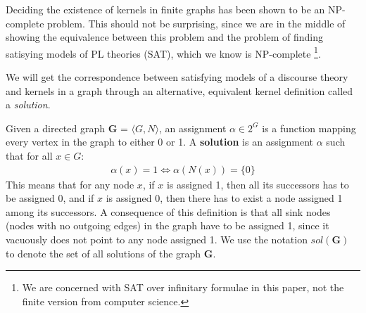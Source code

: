 Deciding the existence of kernels in finite graphs has been shown to be an NP-complete problem\cite{chvatal}.
This should not be surprising, since we are in the middle of showing the equivalence between this problem and the problem of finding satisying models of PL theories (SAT), which we know is NP-complete \footnote{We are concerned with SAT over infinitary formulae in this paper, not the finite version from computer science.}.

We will get the correspondence between satisfying models of a discourse theory and kernels in a graph through an alternative, equivalent kernel definition called a \textit{solution}.

Given a directed graph \textbf{G} = $\langle G,N \rangle$, an assignment $\alpha \in 2^G$ is a function mapping every vertex in the graph to either 0 or 1.
A \textbf{solution} is an assignment $\alpha$ such that for all $x \in G:$
\begin{align}
  \alpha(x) = 1 \iff \alpha(N(x)) = \{ 0 \}
\end{align}
This means that for any node $x$, if $x$ is assigned 1, then all its successors has to be assigned  0, and if $x$ is assigned 0, then there has to exist a node assigned 1 among its successors.
A consequence of this definition is that all sink nodes (nodes with no outgoing edges) in the graph have to be assigned 1, since it vacuously does not point to any node assigned 1.
We use the notation $sol(\mathbf{G})$ to denote the set of all solutions of the graph \textbf{G}.
